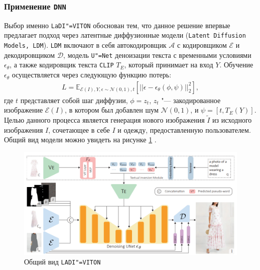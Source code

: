 \subsubsection{Применение \texttt{DNN}}
Выбор именно \texttt{LaDI"=VITON} обоснован тем, что данное решение впервые предлагает подход через латентные диффузионные модели (\texttt{Latent Diffusion Models, LDM}). \texttt{LDM} включают в себя автокодировщик $\mathcal{A}$ с кодировщиком $\mathcal{E}$ и декодировщиком $\mathcal{D}$, модель \texttt{U"=Net}  деноизации текста с временными условиями $\epsilon_{\theta}$, а также кодировщик текста \texttt{CLIP} $T_E$, который принимает на вход $Y$. Обучение $\epsilon_{\theta}$ осуществляется через следующую функцию потерь:
\begin{gather}
    L = \mathbb{E}_{\mathcal{E}(I),Y, \epsilon \sim \mathcal{N}(0, 1), t}[||\epsilon - \epsilon_{\theta}(\phi, \psi)||_2^2],
\end{gather}
где $t$ представляет собой шаг диффузии, $\phi = z_t$, $z_t$ "--- закодированное изображение $\mathcal{E}(I)$, в котором был добавлен шум $\mathcal{N}(0, 1)$, и $\psi = [t, T_E(Y)]$.
Целью данного процесса является генерация нового изображения $\tilde{I}$ из исходного изображения $I$, сочетающее в себе $I$ и одежду, предоставленную пользователем. Общий вид модели можно увидеть на рисунке \ref{fig:ladi_pipeline} \cite{ladi}.
\begin{figure}[H]
    \centering
    \includegraphics[width=0.94\linewidth]{images/ladi_pipeline.png}
    \caption{Общий вид \texttt{LADI"=VITON}}
    \label{fig:ladi_pipeline}
\end{figure}

